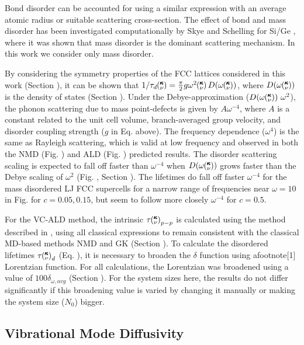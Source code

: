 \documentclass[aps,prb,onecolumn,preprint,superscriptaddress,amsmath,amssymb,floatfix]{revtex4}
\newcommand{\kv}{\mspace{-4.0mu}\left(\mspace{-8.0mu}
\begin{smallmatrix}&\pmb{\kappa} \\&\nu\end{smallmatrix}
\mspace{-3.0mu}\right)}
\begin{document}
Bond disorder 
can be accounted for using a similar expression with an average
atomic radius or suitable scattering cross-section.
\cite{klemens_scattering_1955,klemens_thermal_1957} 
The effect of bond and mass disorder has been investigated computationally 
by Skye and 
Schelling for Si/Ge \cite{skye_thermal_2008}, 
where it was shown that mass disorder is 
the dominant scattering mechanism. In this work we consider only 
mass disorder.

By considering the symmetry properties of the FCC lattices 
considered in this work (Section ), it can be shown that  
$1/\tau_{d}\kv =\frac{\pi}{2} g \omega^2\kv D(\omega\kv)$, where 
$D(\omega\kv)$ is the density of states (Section ).
\cite{tamura_isotope_1983}   
Under the Debye-approximation ($D(\omega\kv)~\omega^{2}$), 
the phonon scattering due to mass point-defects 
is given by $A\omega^{-4}$, where $A$ is a constant related to the unit 
cell volume, branch-averaged group velocity, and disorder coupling strength 
($g$ in Eq. above). 
The frequency dependence ($\omega^4$) is the same as 
Rayleigh scattering, which is valid at low frequency and observed 
in both the NMD (Fig. ) and ALD (Fig. ) predicted results. 
The disorder 
scattering scaling is expected to fall off faster than $\omega^{-4}$ 
when $D(\omega\kv)$ grows faster than the Debye scaling of 
$\omega^{2}$ (Fig. , Section ). 
The lifetimes do fall off faster $\omega^{-4}$ for the 
mass disordered LJ FCC supercells for a narrow range of 
frequencies near $\omega = 10$ in Fig. for $c=0.05,0.15$, 
but seem to follow more closely $\omega^{-4}$ for $c=0.5$. 

For the VC-ALD method, 
the intrinsic $\tau\kv_{p-p}$ is calculated using the method described in
\cite{turney_predicting_2009}, using all classical expressions to remain 
consistent with the classical MD-based methods NMD and GK (Section ). 
To calculate the disordered lifetimes $\tau\kv_{d}$ (Eq. ), 
it is necessary to broaden 
the $\delta$ function using afootnote[1] Lorentzian function. 
For all calculations, the Lorentzian was broadened using a value of 
$100\delta_{\omega,avg}$ (Section ). For the system sizes here, 
the results do not differ significantly 
if this broadening value is varied by changing it manually or making 
the system size ($N_0$) bigger.

\subsection{\label{S:Vibrational Mode Diffusivity}
Vibrational Mode Diffusivity}
\end{document}
